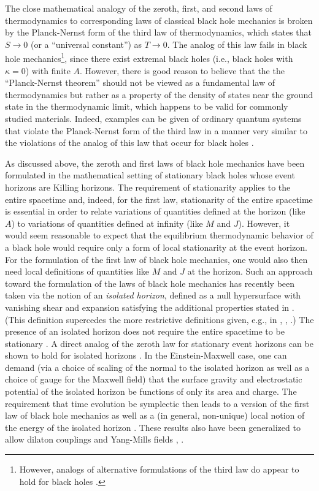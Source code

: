 The close mathematical analogy of the zeroth, first, and second laws
of thermodynamics to corresponding laws of classical black hole
mechanics is broken by the Planck-Nernst form of the third law of
thermodynamics, which states that $S \rightarrow 0$ (or a ``universal
constant'') as $T \rightarrow 0$. The analog of this law fails in
black hole mechanics\footnote{However, analogs of alternative
formulations of the third law do appear to hold for black holes
\cite{i1}.}, since there exist extremal black holes (i.e., black holes
with $\kappa = 0$) with finite $A$. However, there is good reason to
believe that the the ``Planck-Nernst theorem'' should not be viewed as
a fundamental law of thermodynamics \cite{al} but rather as a property
of the density of states near the ground state in the thermodynamic
limit, which happens to be valid for commonly studied
materials. Indeed, examples can be given of ordinary quantum systems
that violate the Planck-Nernst form of the third law in a manner very
similar to the violations of the analog of this law that occur for
black holes \cite{w5}.

As discussed above, the zeroth and first laws of black hole mechanics
have been formulated in the mathematical setting of stationary black
holes whose event horizons are Killing horizons. The requirement of
stationarity applies to the entire spacetime and, indeed, for the
first law, stationarity of the entire spacetime is essential in order
to relate variations of quantities defined at the horizon (like $A$)
to variations of quantities defined at infinity (like $M$ and
$J$). However, it would seem reasonable to expect that the equilibrium
thermodynamic behavior of a black hole would require only a form of
local stationarity at the event horizon. For the formulation of the
first law of black hole mechanics, one would also then need local
definitions of quantities like $M$ and $J$ at the horizon. Such an
approach toward the formulation of the laws of black hole mechanics
has recently been taken via the notion of an {\it isolated horizon},
defined as a null hypersurface with vanishing shear and expansion
satisfying the additional properties stated in \cite{abdf}. (This
definition supercedes the more restrictive definitions given, e.g., in
\cite{abf1}, \cite{abf}, \cite{ac}.) The presence of an isolated
horizon does not require the entire spacetime to be stationary
\cite{lewa}.  A direct analog of the zeroth law for stationary event
horizons can be shown to hold for isolated horizons \cite{afk}. In the
Einstein-Maxwell case, one can demand (via a choice of scaling of the
normal to the isolated horizon as well as a choice of gauge for the
Maxwell field) that the surface gravity and electrostatic potential of
the isolated horizon be functions of only its area and charge. The
requirement that time evolution be symplectic then leads to a version
of the first law of black hole mechanics as well as a (in general,
non-unique) local notion of the energy of the isolated horizon
\cite{afk}.  These results also have been generalized to allow dilaton
couplings \cite{ac} and Yang-Mills fields \cite{cns}, \cite{afk}.


